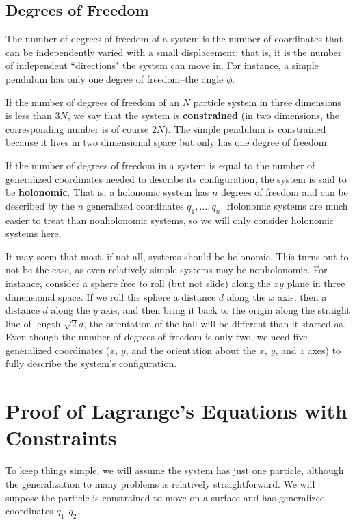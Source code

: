 \subsection*{Degrees of Freedom}
The number of degrees of freedom of a system is the number of coordinates that can be independently varied with a small displacement; that is, it is the number of independent ``directions" the system can move in. For instance, a simple pendulum has only one degree of freedom--the angle $\phi$. 

If the number of degrees of freedom of an $N$ particle system in three dimensions is less than $3N$, we say that the system is \textbf{constrained} (in two dimensions, the corresponding number is of course $2N$). The simple pendulum is constrained because it lives in two dimensional space but only has one degree of freedom. 

If the number of degrees of freedom in a system is equal to the number of generalized coordinates needed to describe its configuration, the system is said to be \textbf{holonomic}. That is, a holonomic system has $n$ degrees of freedom and can be described by the $n$ generalized coordinates $q_1, \dots, q_n$. Holonomic systems are much easier to treat than nonholonomic systems, so we will only consider holonomic systems here.

It may seem that most, if not all, systems should be holonomic. This turns out to not be the case, as even relatively simple systems may be nonholonomic. For instance, consider a sphere free to roll (but not slide) along the $xy$ plane in three dimensional space. If we roll the sphere a distance $d$ along the $x$ axis, then a distance $d$ along the $y$ axis, and then bring it back to the origin along the straight line of length $\sqrt{2}d$, the orientation of the ball will be different than it started as. Even though the number of degrees of freedom is only two, we need five generalized coordinates ($x$, $y$, and the orientation about the $x$, $y$, and $z$ axes) to fully describe the system's configuration. 
\section{Proof of Lagrange's Equations with Constraints}
To keep things simple, we will assume the system has just one particle, although the generalization to many problems is relatively straightforward. We will suppose the particle is constrained to move on a surface and has generalized coordinates $q_1, q_2$. 

